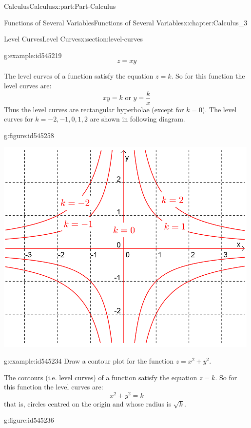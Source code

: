 \documentclass[oneside,10pt,]{book}
\numberwithin{equation}{section}
\begin{document}
\begin{partptx}{Calculus}{}{Calculus}{}{}{x:part:Part-Calculus}
\begin{chapterptx}{Functions of Several Variables}{}{Functions of Several Variables}{}{}{x:chapter:Calculus_3}
\begin{sectionptx}{Level Curves}{}{Level Curves}{}{}{x:section:level-curves}
\begin{example}{}{g:example:id545219}
\begin{equation*}
z=xy
\end{equation*}
%
\par\smallskip%
\noindent\hypertarget{g:solution:id545202}{}The level curves of a function satisfy the equation \(z=k\). So for this function the level curves are:%
\begin{equation*}
xy=k \textrm{ or }y=\frac{k}{x}
\end{equation*}
Thus the level curves are rectangular hyperbolae (except for \(k=0\)).  The level curves for \(k=-2,-1,0,1,2\) are shown in following diagram. \begin{figureptx}{}{g:figure:id545258}{}%
\begin{image}{0.125}{0.75}{0.125}%
\includegraphics[width=\linewidth]{./Calculus/Images/3/2_example8.png}
\end{image}%
\tcblower
\end{figureptx}%
%
\end{example}
\begin{example}{}{g:example:id545234}%
Draw a contour plot for the function \(z=x^2+y^2\).%
\par\smallskip%
\noindent\hypertarget{g:solution:id545238}{}The contours (i.e. level curves) of a function satisfy the equation \(z=k\). So for this function the level curves are:%
\begin{equation*}
x^2+y^2=k
\end{equation*}
that is, circles centred on the origin and whose radius is \(\sqrt{k}\). \begin{figureptx}{}{g:figure:id545236}{}%

\end{figureptx}
\end{example}
\end{sectionptx}
\end{chapterptx}
\end{partptx}
\end{document}
